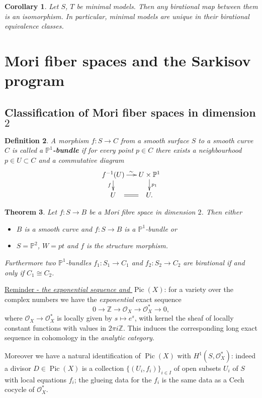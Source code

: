 \documentclass[a4paper,11pt]{amsart}
\newtheorem{theorem}{Theorem}[section]
\newtheorem{corollary}[theorem]{Corollary}
\newtheorem{definition}[theorem]{Definition}
\def\Pic{\operatorname{Pic}}
\newcommand{\OO}{\mathcal{O}}
\newcommand{\ZZ}{\mathbb{Z}}
\newcommand{\PP}{\mathbb{P}}
\newcommand{\isom}{\cong}
\begin{document}
\begin{corollary}\label{cor:uniqueness}
	Let $S$, $T$ be minimal models.
	Then any birational map between them is an isomorphism.	
	In particular, minimal models are unique in their birational equivalence classes.
\end{corollary}

\section{Mori fiber spaces and the Sarkisov program}

\subsection{Classification of Mori fiber spaces in dimension $2$}

\begin{definition}
	A morphism $f\colon S \to C$ from a smooth surface $S$ to a smooth curve $C$ is called a \textbf{$\PP^1$-bundle} if for every point $p \in C$ there exists a neighbourhood $p \in U \subset C$ and a commutative diagram
	\[
	\xymatrix@R=.5cm@C=.5cm{
	f^{-1}(U) \ar[r]^{\sim} \ar[d]_f & U\times \PP^1 \ar[d]^{p_1}\\
	U \ar@{}[r]^(.25){}="a"^(.75){}="b" \ar@{=} "a";"b"& U.
	}
	\]
\end{definition}

\begin{theorem}\label{thm:Mfs}
	Let $f\colon S \to B$ be a Mori fibre space in dimension $2$.
	Then either
	\begin{itemize}
		\item $B$ is a smooth curve and $f\colon S \to B$ is a $\PP^1$-bundle or
		\item $S = \PP^2$, $W = pt$ and $f$ is the structure morphism.
	\end{itemize}
	
	Furthermore two $\PP^1$-bundles $f_1\colon S_1 \to C_1$ and $f_2\colon S_2 \to C_2$ are birational \emph{if and only if} $C_1 \isom C_2$.
\end{theorem}
\begin{center}
\begin{minipage}{.8\textwidth}
	\underline{Reminder - \emph{the exponential sequence and $\Pic(X)$}}: 
	for a variety over the complex numbers we have the \emph{exponential} exact sequence
	\[
	0 \to \ZZ \to \OO_X \to \OO_X^* \to 0,
	\]
	where $\OO_X \to \OO_X^*$ is locally given by $s \mapsto e^{s}$, with kernel the sheaf of locally constant functions with values in $2\pi i\ZZ$.
	This induces the corresponding long exact sequence in cohomology in the \emph{analytic category}.
	
	Moreover we have a natural identification of $\Pic(X)$ with $H^1(S,\OO_X^*)$:
	indeed a divisor $D \in \Pic(X)$ is a collection $\{(U_i,f_i)\}_{i\in I}$ of open subsets $U_i$ of $S$ with local equations $f_i$;
	the glueing data for the $f_i$ is the same data as a Cech cocycle of $\OO_X^*$. 
\end{minipage}
\end{center}
\end{document}
